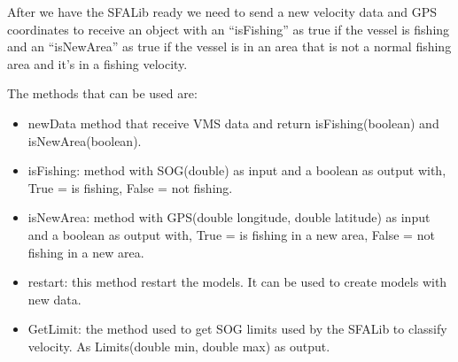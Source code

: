 After we have the SFALib ready we need to send a new velocity data and GPS coordinates to receive an object with an “isFishing” as true if the vessel is fishing and an “isNewArea” as true if the vessel is in an area that is not a normal fishing area and it’s in a fishing velocity.

The methods that can be used are:
\begin{itemize}
\item newData method that receive VMS data and return isFishing(boolean) and isNewArea(boolean).
\item isFishing: method with SOG(double) as input and a boolean as output with, True = is fishing, False = not fishing.
\item isNewArea:  method with GPS(double longitude, double latitude) as input and a boolean as output with, True = is fishing in a new area, False = not fishing in a new area.
\item restart: this method restart the models. It can be used to create models with new data.
\item GetLimit: the method used to get SOG limits used by the SFALib to classify velocity. As Limits(double min, double max) as output.
\end{itemize}
 





